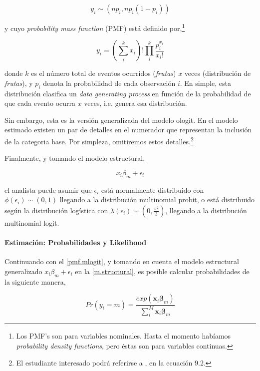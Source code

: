 \documentclass[onesided]{article}\usepackage[]{graphicx}\usepackage[]{color}
\begin{document}
\begin{equation}
y_{i} \sim (np_{i}, np_{i}(1-p_{i}))
\end{equation}

y cuyo \emph{probability mass function} (PMF) est\'a definido por,\footnote{Los PMF's son para variables nominales. Hasta el momento hab\'iamos \emph{probability density functions}, pero \'estas son para variables continuas.}


\begin{equation}\label{pmf.mlogit}
y_{i} = (\sum_{i}^{k}x_{i})!\prod_{i}^{k}\frac{p_{i}^{x_{i}}}{x_{i}!}
\end{equation}

donde $k$ es el n\'umero total de eventos ocurridos (\emph{frutas}) $x$ veces (distribuci\'on de \emph{frutas}), y $p_{i}$ denota la probabilidad de cada observaci\'on $i$. En simple, esta distribuci\'on clasifica un \emph{data generating process} en funci\'on de la probabilidad de que cada evento ocurra $x$ veces, i.e. genera esa distribuci\'on.

Sin embargo, esta es la versi\'on generalizada del modelo ologit. En el modelo estimado existen un par de detalles en el numerador que representan la inclusi\'on de la categoria base. Por simpleza, omitiremos estos detalles.\footnote{El estudiante interesado podr\'a referirse a \textcite{Ward2018}, en la ecuaci\'on 9.2.}

Finalmente, y tomando el modelo estructural,

\begin{equation}\label{m.structural}
x_{i}\beta_{m} + \epsilon_{i}
\end{equation}

el analista puede asumir que $\epsilon_{i}$ est\'a normalmente distribuido con $\phi(\epsilon_{i})\sim(0,1)$ llegando a la distribuci\'on multinomial probit, o est\'a distribuido seg\'un la distribuci\'on log\'istica con $\lambda(\epsilon_{i})\sim(0,\frac{\pi^{2}}{3})$, llegando a la distribuci\'on multinomial logit.


\paragraph{Estimaci\'on: Probabilidades y Likelihood} Continuando con el \autoref{pmf.mlogit}, y tomando en cuenta el modelo estructural generalizado $x_{i}\beta_{m} + \epsilon_{i}$ en la \autoref{m.structural}, es posible calcular probabilidades de la siguiente manera,

\begin{equation}\label{prob.mlogit}
Pr(y_{i}=m) = \frac{exp(\boldsymbol{x}_{i}\boldsymbol{\beta}_{m})}{\sum_{i}^{M}\boldsymbol{x}_{i}\boldsymbol{\beta}_{m}}
\end{equation}
\end{document}
